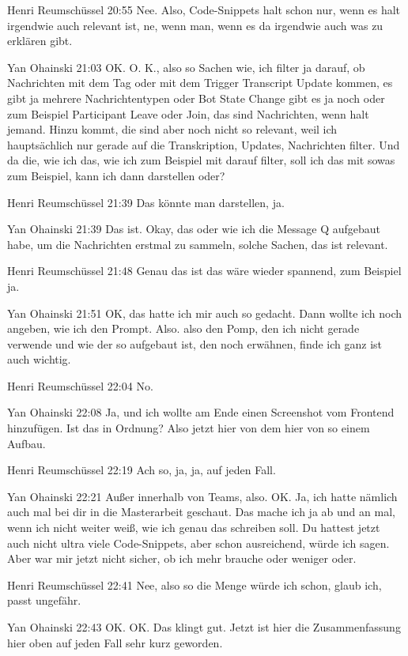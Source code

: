 Henri Reumschüssel   20:55
Nee.
Also, Code-Snippets halt schon nur, wenn es halt irgendwie auch relevant ist, ne, wenn man, wenn es da irgendwie auch was zu erklären gibt.

Yan Ohainski   21:03
OK.
O. K., also so Sachen wie, ich filter ja darauf, ob Nachrichten mit dem Tag oder mit dem Trigger Transcript Update kommen, es gibt ja mehrere Nachrichtentypen oder Bot State Change gibt es ja noch oder zum Beispiel Participant Leave oder Join, das sind Nachrichten, wenn halt jemand.
Hinzu kommt, die sind aber noch nicht so relevant, weil ich hauptsächlich nur gerade auf die Transkription, Updates, Nachrichten filter. Und da die, wie ich das, wie ich zum Beispiel mit darauf filter, soll ich das mit sowas zum Beispiel, kann ich dann darstellen oder?

Henri Reumschüssel   21:39
Das könnte man darstellen, ja.

Yan Ohainski   21:39
Das ist.
Okay, das oder wie ich die Message Q aufgebaut habe, um die Nachrichten erstmal zu sammeln, solche Sachen, das ist relevant.

Henri Reumschüssel   21:48
Genau das ist das wäre wieder spannend, zum Beispiel ja.

Yan Ohainski   21:51
OK, das hatte ich mir auch so gedacht. Dann wollte ich noch angeben, wie ich den Prompt.
Also.
also den Pomp, den ich nicht gerade verwende und wie der so aufgebaut ist, den noch erwähnen, finde ich ganz ist auch wichtig.

Henri Reumschüssel   22:04
No.

Yan Ohainski   22:08
Ja, und ich wollte am Ende einen Screenshot vom Frontend hinzufügen. Ist das in Ordnung?
Also jetzt hier von dem hier von so einem Aufbau.

Henri Reumschüssel   22:19
Ach so, ja, ja, auf jeden Fall.

Yan Ohainski   22:21
Außer innerhalb von Teams, also.
OK.
Ja, ich hatte nämlich auch mal bei dir in die Masterarbeit geschaut. Das mache ich ja ab und an mal, wenn ich nicht weiter weiß, wie ich genau das schreiben soll. Du hattest jetzt auch nicht ultra viele Code-Snippets, aber schon ausreichend, würde ich sagen. Aber war mir jetzt nicht sicher, ob ich mehr brauche oder weniger oder.

Henri Reumschüssel   22:41
Nee, also so die Menge würde ich schon, glaub ich, passt ungefähr.

Yan Ohainski   22:43
OK.
OK.
Das klingt gut.
Jetzt ist hier die Zusammenfassung hier oben auf jeden Fall sehr kurz geworden.

